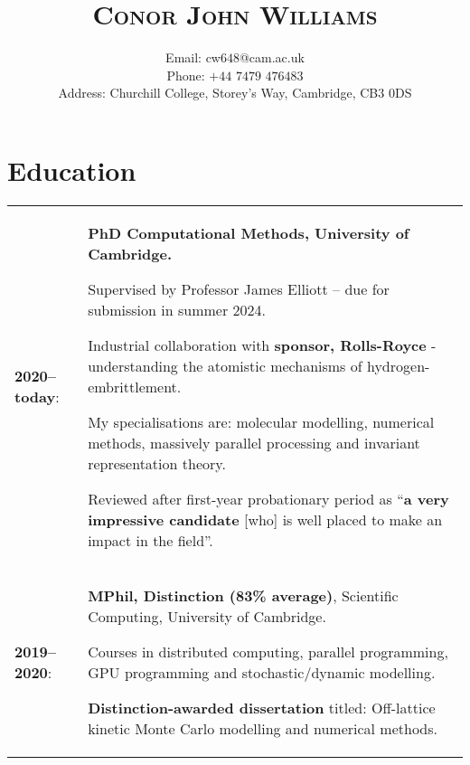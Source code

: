 \documentclass[11pt]{article}
\title{\Huge\textsc{Conor John Williams}}
\date{}
\author{Email: cw$648$@cam.ac.uk \\ Phone: $+44$ $7479$ $476483$ \\ Address: Churchill College, Storey's Way, Cambridge, CB$3$ $0$DS}
\renewcommand{\arraystretch}{1.4} %
\begin{document}
\maketitle

\thispagestyle{empty}

\renewcommand{\arraystretch}{1.7} %

\section*{Education} \label{sec:intro}

\begin{tabular}{@{}lp{}@{}}
    \textbf{2020--today}: & \textbf{PhD Computational Methods, University of Cambridge.}

    
    \vspace{0.5em}
    
    Supervised by Professor James Elliott – due for submission in summer 2024.
    
    \vspace{0.5em}
    
    Industrial collaboration with \textbf{sponsor, Rolls-Royce} - understanding the atomistic mechanisms of hydrogen-embrittlement.  
    
    \vspace{0.5em}
    
    My specialisations are: molecular modelling, numerical methods, massively parallel processing and invariant representation theory.
    
    \vspace{0.5em}
    
    Reviewed after first-year probationary period as ``\textbf{a very impressive candidate} [who] is well placed to make an impact in the field''.    \\
    
    \textbf{2019--2020}:  & \textbf{MPhil, Distinction (\num{83}\% average)}, Scientific Computing, University of Cambridge.
    
    \vspace{0.5em}
    
    Courses in distributed computing, parallel programming, GPU programming and stochastic/dynamic modelling.
    
    \vspace{0.5em}
    
    \textbf{Distinction-awarded dissertation} titled: Off-lattice kinetic Monte Carlo modelling and numerical methods.                                \\
    

\end{tabular}
\end{document}
